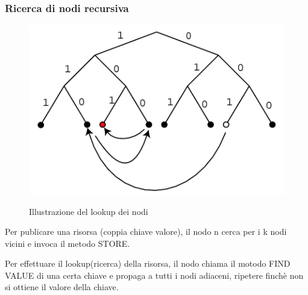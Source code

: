 \subsubsection{Ricerca di nodi recursiva}

\begin{figure}[h!]
    \centering
    \includegraphics[width=0.5\linewidth]{imgs/13 - kademlia tree.png}
    \label{fig:kademlia-tree}
    \caption{Illustrazione del lookup dei nodi}
\end{figure}

Per publicare una risorsa (coppia chiave valore), il nodo n cerca per i k nodi vicini e invoca il metodo STORE.

Per effettuare il lookup(ricerca) della risorsa, il nodo chiama il motodo FIND VALUE di una certa chiave e propaga a tutti i nodi adiaceni, ripetere finchè non si ottiene il valore della chiave.
